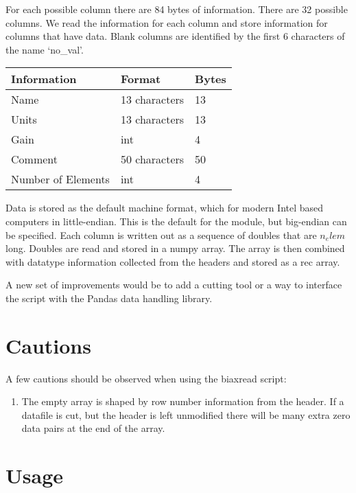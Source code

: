 \documentclass[a4paper,11pt,oneside]{article}
\begin{document}
For each possible column there are 84 bytes of information.  There are 32 possible columns.  We read the information for each column and store information for columns that have data.  Blank columns are identified by the first 6 characters of the name `no\_val'.  

\begin{table}[h]
	\begin{center}
	\begin{tabular}{| l | l | l |}
		\hline
                  \rowcolor[gray]{.85}
		Information & Format & Bytes\\
		\hline
		Name & 13 characters &  13\\
		\hline
		Units & 13 characters &  13 \\
		\hline
		Gain & int & 4\\
		\hline
		Comment & 50 characters & 50\\
		\hline
		Number of Elements & int & 4\\
	\end{tabular}
	\end{center}
	\label{BinaryColHeadFormat}
\end{table}

Data is stored as the default machine format, which for modern Intel based computers in little-endian.  This is the default for the module, but big-endian can be specified.  Each column is written out as a sequence of doubles that are $n_elem$ long.  Doubles are read and stored in a numpy array.  The array is then combined with datatype information collected from the headers and stored as a rec array.

A new set of improvements would be to add a cutting tool or a way to interface the script with the Pandas data handling library.

\section{Cautions}
A few cautions should be observed when using the biaxread script:

\begin{enumerate}
\item The empty array is shaped by row number information from the header.  If a datafile is cut, but the header is left unmodified there will be many extra zero data pairs at the end of the array.
\end{enumerate}

\section{Usage}
\end{document}
